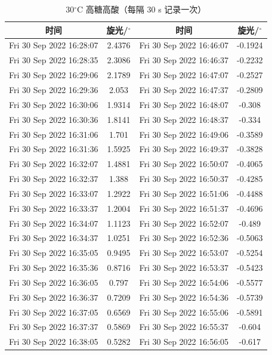 \documentclass[12pt]{ctexart}
\numberwithin{equation}{section}
\begin{document}
\begin{longtable}{cc|cc}
    \caption{30$^\circ$C 高糖高酸（每隔 30 s 记录一次）} \\
    \hline
    时间 & 旋光/$^\circ$ & 时间 & 旋光/$^\circ$ \\
    \hline
    Fri 30 Sep 2022 16:28:07 & 2.4376 & Fri 30 Sep 2022 16:46:07 & -0.1924\\
Fri 30 Sep 2022 16:28:35 & 2.3086 & Fri 30 Sep 2022 16:46:37 & -0.2232\\
Fri 30 Sep 2022 16:29:06 & 2.1789 & Fri 30 Sep 2022 16:47:07 & -0.2527\\
Fri 30 Sep 2022 16:29:36 & 2.053 & Fri 30 Sep 2022 16:47:37 & -0.2809\\
Fri 30 Sep 2022 16:30:06 & 1.9314 & Fri 30 Sep 2022 16:48:07 & -0.308\\
Fri 30 Sep 2022 16:30:36 & 1.8141 & Fri 30 Sep 2022 16:48:37 & -0.334\\
Fri 30 Sep 2022 16:31:06 & 1.701 & Fri 30 Sep 2022 16:49:06 & -0.3589\\
Fri 30 Sep 2022 16:31:36 & 1.5925 & Fri 30 Sep 2022 16:49:37 & -0.3828\\
Fri 30 Sep 2022 16:32:07 & 1.4881 & Fri 30 Sep 2022 16:50:07 & -0.4065\\
Fri 30 Sep 2022 16:32:37 & 1.388 & Fri 30 Sep 2022 16:50:37 & -0.4285\\
Fri 30 Sep 2022 16:33:07 & 1.2922 & Fri 30 Sep 2022 16:51:06 & -0.4488\\
Fri 30 Sep 2022 16:33:37 & 1.2004 & Fri 30 Sep 2022 16:51:37 & -0.4696\\
Fri 30 Sep 2022 16:34:07 & 1.1123 & Fri 30 Sep 2022 16:52:07 & -0.489\\
Fri 30 Sep 2022 16:34:37 & 1.0251 & Fri 30 Sep 2022 16:52:36 & -0.5063\\
Fri 30 Sep 2022 16:35:05 & 0.9495 & Fri 30 Sep 2022 16:53:07 & -0.5254\\
Fri 30 Sep 2022 16:35:36 & 0.8716 & Fri 30 Sep 2022 16:53:37 & -0.5423\\
Fri 30 Sep 2022 16:36:05 & 0.797 & Fri 30 Sep 2022 16:54:06 & -0.5577\\
Fri 30 Sep 2022 16:36:37 & 0.7209 & Fri 30 Sep 2022 16:54:36 & -0.5739\\
Fri 30 Sep 2022 16:37:05 & 0.6569 & Fri 30 Sep 2022 16:55:06 & -0.5891\\
Fri 30 Sep 2022 16:37:37 & 0.5869 & Fri 30 Sep 2022 16:55:37 & -0.604\\
Fri 30 Sep 2022 16:38:05 & 0.5282 & Fri 30 Sep 2022 16:56:05 & -0.617\\

\end{longtable}
\end{document}
